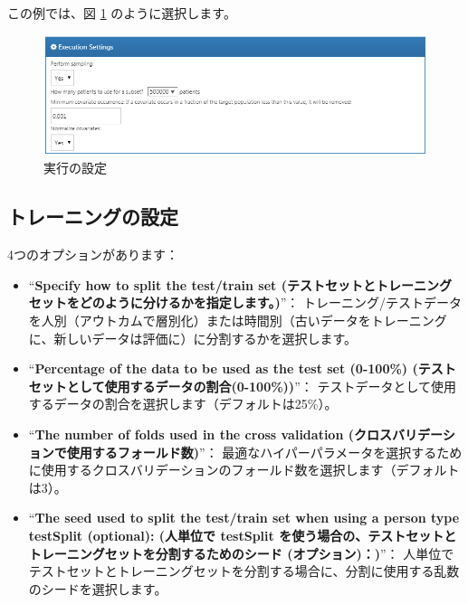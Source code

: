 \documentclass[
  11pt]{book}
\theoremstyle{definition}
\theoremstyle{definition}
\theoremstyle{definition}
\theoremstyle{definition}
\theoremstyle{remark}
\begin{document}
この例では、図 \ref{fig:executionSettings} のように選択します。

\begin{figure}

{\centering \includegraphics[width=1\linewidth]{images/PatientLevelPrediction/executionSettings} 

}

\caption{実行の設定}\label{fig:executionSettings}
\end{figure}

\subsection{トレーニングの設定}\label{ux30c8ux30ecux30fcux30cbux30f3ux30b0ux306eux8a2dux5b9a}

4つのオプションがあります：

\begin{itemize}
\item
  ``\textbf{Specify how to split the test/train set (テストセットとトレーニングセットをどのように分けるかを指定します。)}''： トレーニング/テストデータを人別（アウトカムで層別化）または時間別（古いデータをトレーニングに、新しいデータは評価に）に分割するかを選択します。
\item
  ``\textbf{Percentage of the data to be used as the test set (0-100\%) (テストセットとして使用するデータの割合(0-100\%))}''： テストデータとして使用するデータの割合を選択します（デフォルトは25\%）。
\item
  ``\textbf{The number of folds used in the cross validation (クロスバリデーションで使用するフォールド数)}''： 最適なハイパーパラメータを選択するために使用するクロスバリデーションのフォールド数を選択します（デフォルトは3）。
\item
  ``\textbf{The seed used to split the test/train set when using a person type testSplit (optional): (人単位で testSplit を使う場合の、テストセットとトレーニングセットを分割するためのシード (オプション)：)}''： 人単位でテストセットとトレーニングセットを分割する場合に、分割に使用する乱数のシードを選択します。
\end{itemize}
\end{document}
